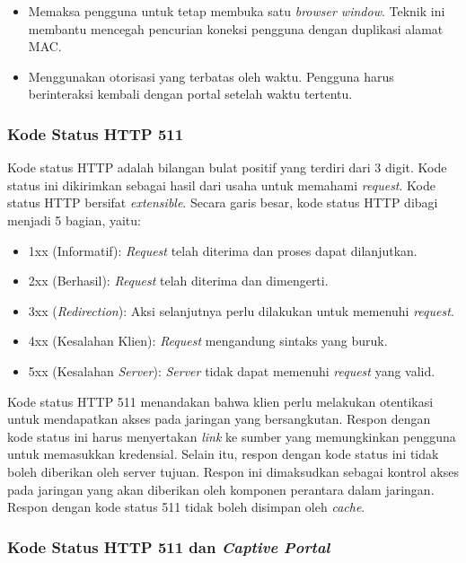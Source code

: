 \begin{itemize}
    \item{Memaksa pengguna untuk tetap membuka satu \textit{browser window}. Teknik ini membantu mencegah pencurian koneksi pengguna dengan duplikasi alamat MAC.}
    \item{Menggunakan otorisasi yang terbatas oleh waktu. Pengguna harus berinteraksi kembali dengan portal setelah waktu tertentu.}
\end{itemize}

\subsubsection{Kode Status HTTP 511}
\label{par:http_511}

Kode status HTTP adalah bilangan bulat positif yang terdiri dari 3 digit\cite{IETF_HTTP:2016}. Kode status ini dikirimkan sebagai hasil dari usaha untuk memahami \textit{request}. Kode status HTTP bersifat \textit{extensible}. Secara garis besar, kode status HTTP dibagi menjadi 5 bagian, yaitu:

\begin{itemize}
    \item{1xx (Informatif): \textit{Request} telah diterima dan proses dapat dilanjutkan.}
    \item{2xx (Berhasil): \textit{Request} telah diterima dan dimengerti.}
    \item{3xx (\textit{Redirection}): Aksi selanjutnya perlu dilakukan untuk memenuhi \textit{request}.}
    \item{4xx (Kesalahan Klien): \textit{Request} mengandung sintaks yang buruk.}
    \item{5xx (Kesalahan \textit{Server}): \textit{Server} tidak dapat memenuhi \textit{request} yang valid.}
\end{itemize}

Kode status HTTP 511 menandakan bahwa klien perlu melakukan otentikasi untuk mendapatkan akses pada jaringan yang bersangkutan\cite{IETF_HTTP_AdditionalStatus:2016}. Respon dengan kode status ini harus menyertakan \textit{link} ke sumber yang memungkinkan pengguna untuk memasukkan kredensial. Selain itu, respon dengan kode status ini tidak boleh diberikan oleh server tujuan. Respon ini dimaksudkan sebagai kontrol akses pada jaringan yang akan diberikan oleh komponen perantara dalam jaringan. Respon dengan kode status 511 tidak boleh disimpan oleh \textit{cache}.

\subsubsection{Kode Status HTTP 511 dan \textit{Captive Portal}}
\label{par:http_511_and_captive_portal}

